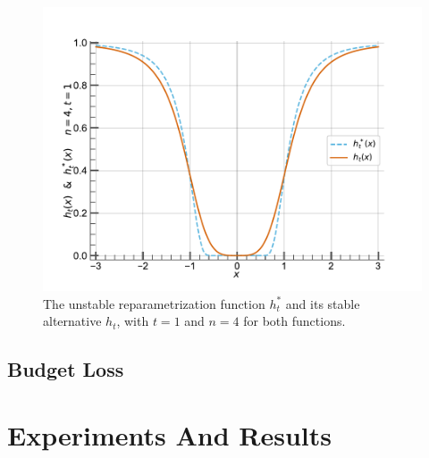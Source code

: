 \begin{figure}[htb]
  \centering
  \centerline{\includegraphics[width=0.5\linewidth]{chapter_1/assets/h_stable_vs_unstable.pdf}}
  \caption{\centering The unstable reparametrization function $h_t^*$ and its
  stable alternative $h_t$, with $t=1$ and $n=4$ for both functions.} 
  \label{fig:chap1:h_stable_vs_unstable}
\end{figure}

\subsection{Budget Loss}
\label{sec:chap1:budget_loss}

\section{Experiments And Results}